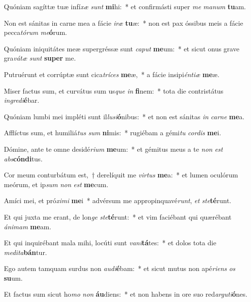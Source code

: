 \item Quóniam sagíttæ tuæ infí\textit{xæ} \textit{sunt} \textbf{mi}hi:~* et confirmásti super \textit{me} \textit{ma}\textit{num} \textbf{tu}am.
\item Non est sánitas in carne mea a fácie \textit{i}\textit{ræ} \textbf{tu}æ:~* non est pax óssibus meis a fácie pecca\textit{tó}\textit{rum} \textit{me}\textbf{ó}rum.
\item Quóniam iniquitátes meæ supergréssæ sunt \textit{ca}\textit{put} \textbf{me}um:~* et sicut onus grave gra\textit{vá}\textit{tæ} \textit{sunt} \textbf{su}\textbf{per} me.
\item Putruérunt et corrúptæ sunt cica\textit{trí}\textit{ces} \textbf{me}æ,~* a fácie insipi\textit{én}\textit{ti}\textit{æ} \textbf{me}æ.
\item Miser factus sum, et curvátus sum us\textit{que} \textit{in} \textbf{fi}nem:~* tota die contristátus \textit{in}\textit{gre}\textit{di}\textbf{é}bar.
\item Quóniam lumbi mei impléti sunt il\textit{lu}\textit{si}\textbf{ó}nibus:~* et non est sánitas \textit{in} \textit{car}\textit{ne} \textbf{me}a.
\item Afflíctus sum, et humiliá\textit{tus} \textit{sum} \textbf{ni}mis:~* rugiébam a gémi\textit{tu} \textit{cor}\textit{dis} \textbf{me}i.
\item Dómine, ante te omne desidé\textit{ri}\textit{um} \textbf{me}um:~* et gémitus meus a te \textit{non} \textit{est} \textit{abs}\textbf{cón}\textbf{di}tus.
\item Cor meum conturbátum est,~† derelíquit me \textit{vir}\textit{tus} \textbf{me}a:~* et lumen oculórum meórum, et ip\textit{sum} \textit{non} \textit{est} \textbf{me}cum.
\item Amíci mei, et pró\textit{xi}\textit{mi} \textbf{me}i~* advérsum me appropinquavé\textit{runt}, \textit{et} \textit{ste}\textbf{té}runt.
\item Et qui juxta me erant, de lon\textit{ge} \textit{ste}\textbf{té}runt:~* et vim faciébant qui quærébant \textit{á}\textit{ni}\textit{mam} \textbf{me}am.
\item Et qui inquirébant mala mihi, locúti sunt \textit{va}\textit{ni}\textbf{tá}tes:~* et dolos tota die \textit{me}\textit{di}\textit{ta}\textbf{bán}tur.
\item Ego autem tamquam surdus non \textit{au}\textit{di}\textbf{é}bam:~* et sicut mutus non apé\textit{ri}\textit{ens} \textit{os} \textbf{su}um.
\item Et factus sum sicut ho\textit{mo} \textit{non} \textbf{áu}diens:~* et non habens in ore suo red\textit{ar}\textit{gu}\textit{ti}\textbf{ó}nes.
